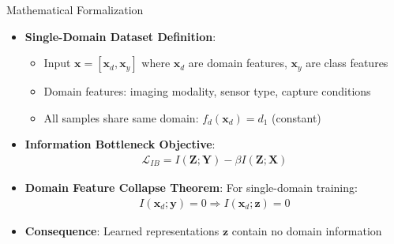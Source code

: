 \documentclass[aspectratio=169]{beamer}
\begin{document}
\begin{frame}{Mathematical Formalization}
\begin{itemize}
    \item \textbf{Single-Domain Dataset Definition}:
    \begin{itemize}
        \item Input $\mathbf{x} = [\mathbf{x}_d, \mathbf{x}_y]$ where $\mathbf{x}_d$ are domain features, $\mathbf{x}_y$ are class features
        \item Domain features: imaging modality, sensor type, capture conditions
        \item All samples share same domain: $f_d(\mathbf{x}_d) = d_1$ (constant)
    \end{itemize}
    \item \textbf{Information Bottleneck Objective}:
    \begin{align}
        \mathcal{L}_{IB} = I(\mathbf{Z}; \mathbf{Y}) - \beta I(\mathbf{Z}; \mathbf{X})
    \end{align}
    \item \textbf{Domain Feature Collapse Theorem}: For single-domain training:
    \begin{align}
        I(\mathbf{x}_d; \mathbf{y}) = 0 \Rightarrow I(\mathbf{x}_d; \mathbf{z}) = 0
    \end{align}
    \item \textbf{Consequence}: Learned representations $\mathbf{z}$ contain no domain information
\end{itemize}
\end{frame}
\end{document}
